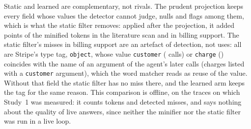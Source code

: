 Static and learned are complementary, not rivals. The prudent projection keeps every field whose values the
detector cannot judge, nulls and flags among them, which is what the static filter removes: applied after the
projection, it added \BaseBothAddsiii{} points of the minified tokens in the literature scan and \BaseBothAddsiv{}
in billing support. The static filter's misses in billing support are an artefact of detection, not uses: all are
Stripe's type tag, \texttt{object}, whose value \texttt{customer} (\BaseObjectCustomer{} calls) or \texttt{charge}
(\BaseObjectCharge) coincides with the name of an argument of the agent's later calls (charges listed with a
\texttt{customer} argument), which the word matcher reads as reuse of the value. Without that field the static
filter has no miss there, and the learned arm keeps the tag for the same reason. This comparison is offline, on the
traces on which Study~1 was measured: it counts tokens and detected misses, and says nothing about the quality of
live answers, since neither the minifier nor the static filter was run in a live loop.

\begin{table}[t]
\centering\small
\resizebox{\textwidth}{!}{}
\caption{Baselines, offline, on the Phase A traces, each run held out. Calls: held-out structured calls, the
denominator of the misses; raw tokens: every call of the held-out runs. Tokens removed against raw:
\emph{minified} (compact JSON, nothing removed), \emph{static} (the pre-registered filter, then minified),
\emph{learned} (the library's default projection), \emph{both} (static after learned). Learned vs static: what the
learned arm removes of the static arm's tokens. Misses: held-out structured calls in which the arm removes a field
the run used later; none for raw and minified. $^{\ast}$Every static miss is Stripe's type tag, a coincidence of
detection (see text). $^\dagger$Simulated tools.}
\label{tab:baselines}
\end{table}


